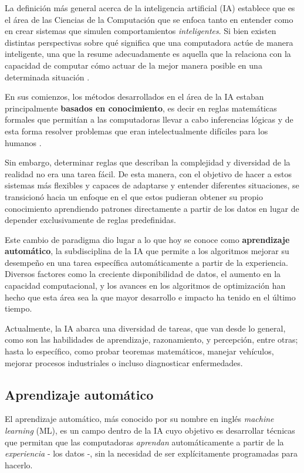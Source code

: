 \documentclass[../../main.tex]{subfiles}
\begin{document}
La definición más general acerca de la inteligencia artificial (IA) establece que es el
área de las Ciencias de la Computación que se enfoca tanto en entender como en crear
sistemas que simulen comportamientos \textit{inteligentes}. Si bien existen distintas
perspectivas sobre qué significa que una computadora actúe de manera inteligente, una que
la resume adecuadamente es aquella que la relaciona con la capacidad de computar cómo
actuar de la mejor manera posible en una determinada situación
\cite{ai-a-modern-approach}.

En sus comienzos, los métodos desarrollados en el área de la IA estaban principalmente
\textbf{basados en conocimiento}, es decir en reglas matemáticas formales que permitían a las
computadoras llevar a cabo inferencias lógicas y de esta forma resolver problemas que eran
intelectualmente difíciles para los humanos \cite{deep-learning}.

Sin embargo, determinar reglas que describan la complejidad y diversidad de la realidad no
era una tarea fácil. De esta manera, con el objetivo de hacer a estos sistemas más
flexibles y capaces de adaptarse y entender diferentes situaciones, se transicionó hacia
un enfoque en el que estos pudieran obtener su propio conocimiento aprendiendo patrones
directamente a partir de los datos en lugar de depender exclusivamente de reglas
predefinidas.

Este cambio de paradigma dio lugar a lo que hoy se conoce como \textbf{aprendizaje
automático}, la subdisciplina de la IA que permite a los algoritmos mejorar su desempeño
en una tarea específica automáticamente a partir de la experiencia. Diversos factores como
la creciente disponibilidad de datos, el aumento en la capacidad computacional, y los
avances en los algoritmos de optimización \cite{deep-learning} han hecho que esta área sea
la que mayor desarrollo e impacto ha tenido en el último tiempo.

Actualmente, la IA abarca una diversidad de tareas, que van desde lo general, como son las
habilidades de aprendizaje, razonamiento, y percepción, entre otras; hasta lo específico,
como probar teoremas matemáticos, manejar vehículos, mejorar procesos industriales o
incluso diagnosticar enfermedades.

\subsection{Aprendizaje automático}
El aprendizaje automático, más conocido por su nombre en inglés \textit{machine learning}
(ML), es un campo dentro de la IA cuyo objetivo es desarrollar técnicas que permitan que
las computadoras \textit{aprendan} automáticamente a partir de la \textit{experiencia} -
los datos -, sin la necesidad de ser explícitamente programadas para hacerlo.
\end{document}
